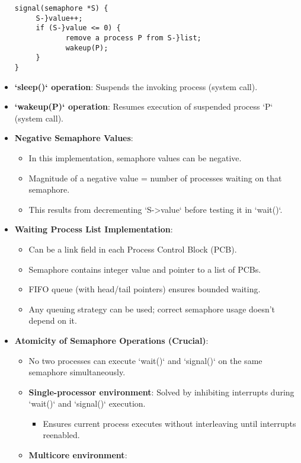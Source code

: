 \begin{itemize}
\begin{verbatim}
signal(semaphore *S) {
     S-}value++;
     if (S-}value <= 0) {
            remove a process P from S-}list;
            wakeup(P);
     }
}
\end{verbatim}
    \item \textbf{`sleep()` operation}: Suspends the invoking process (system call).
    \item \textbf{`wakeup(P)` operation}: Resumes execution of suspended process `P` (system call).
    \item \textbf{Negative Semaphore Values}:
    \begin{itemize}
        \item In this implementation, semaphore values can be negative.
        \item Magnitude of a negative value = number of processes waiting on that semaphore.
        \item This results from decrementing `S->value` before testing it in `wait()`.
    \end{itemize}
    \item \textbf{Waiting Process List Implementation}:
    \begin{itemize}
        \item Can be a link field in each Process Control Block (PCB).
        \item Semaphore contains integer value and pointer to a list of PCBs.
        \item FIFO queue (with head/tail pointers) ensures bounded waiting.
        \item Any queuing strategy can be used; correct semaphore usage doesn't depend on it.
    \end{itemize}
    \item \textbf{Atomicity of Semaphore Operations (Crucial)}:
    \begin{itemize}
        \item No two processes can execute `wait()` and `signal()` on the same semaphore simultaneously.
        \item \textbf{Single-processor environment}: Solved by inhibiting interrupts during `wait()` and `signal()` execution.
        \begin{itemize}
            \item Ensures current process executes without interleaving until interrupts reenabled.
        \end{itemize}
        \item \textbf{Multicore environment}:

\end{itemize}
\end{itemize}
